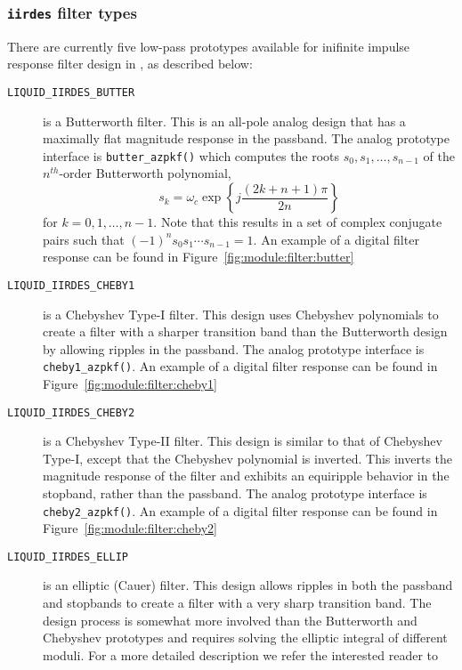 \subsubsection{{\tt iirdes} filter types}
\label{module:filter:iirdes:types}
There are currently five low-pass prototypes available for inifinite impulse
response filter design in \liquid, as described below:
%
\begin{description}
\item[{\tt LIQUID\_IIRDES\_BUTTER}]
    is a Butterworth filter.
    This is an all-pole analog design that has a maximally flat magnitude
    response in the passband.
    The analog prototype interface is {\tt butter\_azpkf()} which computes the
    roots $s_0,s_1,\ldots,s_{n-1}$ of the $n^{th}$-order Butterworth
    polynomial,
    \[
        s_k = \omega_c \exp\left\{
                    j \frac{\left(2k+n+1\right)\pi}{2n}
              \right\}
    \]
    for $k=0,1,\ldots,n-1$.
    Note that this results in a set of complex conjugate pairs such that
    $(-1)^n s_0 s_1 \cdots s_{n-1} = 1$.
    An example of a digital filter response can be found in
    Figure~\ref{fig:module:filter:butter}
\item[{\tt LIQUID\_IIRDES\_CHEBY1}]
    is a Chebyshev Type-I filter.
    This design uses Chebyshev polynomials to create a filter with a sharper
    transition band than the Butterworth design by allowing ripples in the
    passband.
    The analog prototype interface is {\tt cheby1\_azpkf()}.
    An example of a digital filter response can be found in
    Figure~\ref{fig:module:filter:cheby1}
\item[{\tt LIQUID\_IIRDES\_CHEBY2}]
    is a Chebyshev Type-II filter.
    This design is similar to that of Chebyshev Type-I, except that the
    Chebyshev polynomial is inverted.
    This inverts the magnitude response of the filter and exhibits an
    equiripple behavior in the stopband, rather than the passband.
    The analog prototype interface is {\tt cheby2\_azpkf()}.
    An example of a digital filter response can be found in
    Figure~\ref{fig:module:filter:cheby2}
\item[{\tt LIQUID\_IIRDES\_ELLIP}]
    is an elliptic (Cauer) filter.
    This design allows ripples in both the passband and stopbands to create a
    filter with a very sharp transition band.
    The design process is somewhat more involved than the Butterworth and
    Chebyshev prototypes and requires solving the elliptic integral of
    different moduli.
    For a more detailed description we refer the interested reader to

\end{description}
